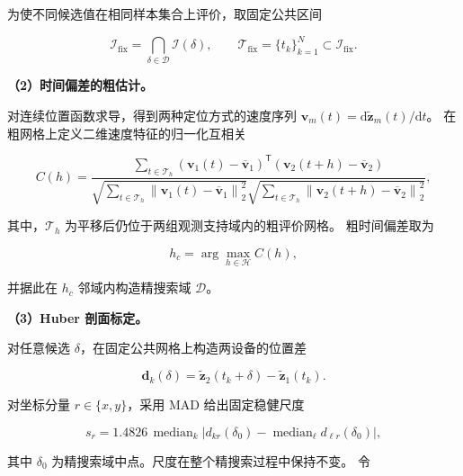 为使不同候选值在相同样本集合上评价，取固定公共区间

\begin{equation}
\mathcal I_{\mathrm{fix}}
=\bigcap_{\delta\in\mathcal D}\mathcal I(\delta),
\qquad
\mathcal T_{\mathrm{fix}}=\{t_k\}_{k=1}^{N}
\subset\mathcal I_{\mathrm{fix}}.
\label{eq:q2-fixed-grid}
\end{equation}

\noindent\textbf{（2）时间偏差的粗估计。}

对连续位置函数求导，得到两种定位方式的速度序列
\(\mathbf v_m(t)=\mathrm d\widetilde{\mathbf z}_m(t)/\mathrm dt\)。
在粗网格上定义二维速度特征的归一化互相关

\begin{equation}
C(h)=
\frac{\displaystyle
\sum_{t\in\mathcal T_h}
\left(\mathbf v_1(t)-\overline{\mathbf v}_1\right)^\mathsf T
\left(\mathbf v_2(t+h)-\overline{\mathbf v}_2\right)}
{\displaystyle
\sqrt{\sum_{t\in\mathcal T_h}
\left\|\mathbf v_1(t)-\overline{\mathbf v}_1\right\|_2^2}
\sqrt{\sum_{t\in\mathcal T_h}
\left\|\mathbf v_2(t+h)-\overline{\mathbf v}_2\right\|_2^2}},
\label{eq:q2-ncc}
\end{equation}

其中，\(\mathcal T_h\) 为平移后仍位于两组观测支持域内的粗评价网格。
粗时间偏差取为

\begin{equation}
h_c=\arg\max_{h\in\mathcal H} C(h),
\label{eq:q2-coarse-offset}
\end{equation}

并据此在 \(h_c\) 邻域内构造精搜索域 \(\mathcal D\)。

\noindent\textbf{（3）Huber 剖面标定。}

对任意候选 \(\delta\)，在固定公共网格上构造两设备的位置差

\begin{equation}
\mathbf d_k(\delta)=
\widetilde{\mathbf z}_2(t_k+\delta)
-\widetilde{\mathbf z}_1(t_k).
\label{eq:q2-residual}
\end{equation}

对坐标分量 \(r\in\{x,y\}\)，采用 MAD 给出固定稳健尺度

\begin{equation}
s_r=1.4826\,
\operatorname{median}_k
\left|d_{kr}(\delta_0)
-\operatorname{median}_{\ell}d_{\ell r}(\delta_0)\right|,
\label{eq:q2-robust-scale}
\end{equation}

其中 \(\delta_0\) 为精搜索域中点。尺度在整个精搜索过程中保持不变。
令

